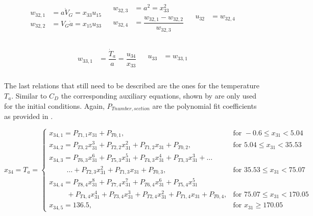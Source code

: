 \begin{align} \label{eq:u32}
\begin{split}
w_{32,1} &= a\dot{V}_{G} = x_{33}u_{15} \\
w_{32,2} &= V_{G}\dot{a} = x_{15}u_{33} \\
\end{split}
&
\begin{split}
w_{32,3} &= a^{2} = x_{33}^2 \\
w_{32,4} &= \dfrac{w_{32,1}-w_{32,2}}{w_{32,3}} \\
\end{split}
&
\begin{split}
u_{32} &= w_{32,4} \\
\end{split}
\end{align}

\begin{align} \label{eq:u33}
\begin{split}
w_{33,1} &= \dfrac{\dot{T}_{a}}{a} = \dfrac{u_{34}}{x_{33}} \\
\end{split}
&
\begin{split}
u_{33} &= w_{33,1} \\
\end{split}
\end{align}

The last relations that still need to be described are the ones for the temperature $T_{a}$. Similar to $C_{D}$ the corresponding auxiliary equations, shown by  are only used for the initial conditions. Again, $P_{T number,section}$ are the polynomial fit coefficients as provided in .

\begin{equation}\label{eq:tempCondAux}
x_{34}=T_{a}=\begin{cases}
x_{34,1}=P_{T 1,1}x_{31}+P_{T 0,1}, & \text{for } -0.6 \leq x_{31} < 5.04  \\
x_{34,2}=P_{T 3,2}x_{31}^{3}+P_{T 2,2}x_{31}^{2}+P_{T 1,2}x_{31}+P_{T 0,2}, &  \text{for } 5.04 \leq x_{31} < 35.53   \\
x_{34,3}=P_{T 6,3}x_{31}^{6}+P_{T 5,3}x_{31}^{5}+P_{T 4,3}x_{31}^{4}+P_{T 3,3}x_{31}^{3}+ \dots \\
\qquad\ \ \dotsc +P_{T 2,3}x_{31}^{2}+P_{T 1,3}x_{31}+P_{T 0,3}, &  \text{for } 35.53 \leq x_{31} < 75.07   \\
x_{34,4}=P_{T 8,4}x_{31}^{8}+P_{T 7,4}x_{31}^{7}+P_{T 6,4}x_{31}^{6}+P_{T 5,4}x_{31}^{5} \\
\qquad\ \ +P_{T 4,4}x_{31}^{4}+P_{T 3,4}x_{31}^{3}+P_{T 2,4}x_{31}^{2}+P_{T 1,4}x_{31}+P_{T 0,4}, &  \text{for } 75.07 \leq x_{31} < 170.05   \\
x_{34,5}=136.5, &  \text{for }  x_{31} \geq 170.05   
\end{cases}
\end{equation}

